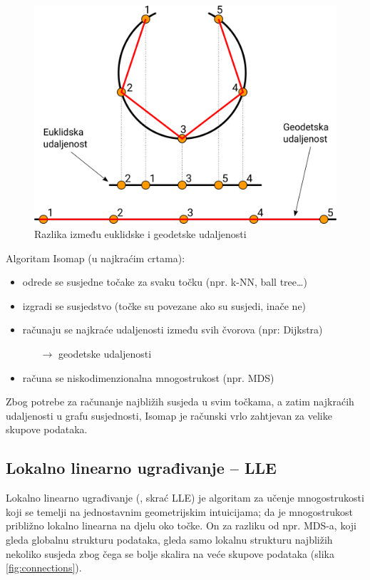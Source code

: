 \documentclass[times, utf8, diplomski]{fer}
\begin{document}
\begin{figure}[htb]
    \centering
    \includegraphics[width=12cm]{resources/images/reduction/euclid_vs_geodetic.png}
    \caption{Razlika između euklidske i geodetske udaljenosti}
    \label{fig:euclid_vs_geodetic}
\end{figure}

Algoritam Isomap (u najkraćim crtama):
\begin{itemize}
    \item odrede se susjedne točake za svaku točku (npr. k-NN, ball tree\dots)
    \item izgradi se susjedstvo (točke su povezane ako su susjedi, inače ne)
    \item računaju se najkraće udaljenosti između svih čvorova (npr: Dijkstra)
          \begin{itemize}
              \item[$\rightarrow$] geodetske udaljenosti
          \end{itemize}
    \item računa se niskodimenzionalna mnogostrukost (npr. MDS)
\end{itemize}

\bigskip
Zbog potrebe za računanje najbližih susjeda u svim točkama, a zatim najkraćih udaljenosti u grafu susjednosti, Isomap je računski vrlo zahtjevan za velike skupove podataka.

\subsection{Lokalno linearno ugrađivanje -- LLE}
Lokalno linearno ugrađivanje (, skrać LLE) je algoritam za učenje mnogostrukosti koji se temelji na jednostavnim geometrijskim intuicijama; da je mnogostrukost približno lokalno linearna na djelu oko točke. On za razliku od npr. MDS-a, koji gleda globalnu strukturu podataka, gleda samo lokalnu strukturu najbližih nekoliko susjeda zbog čega se bolje skalira na veće skupove podataka (slika \ref{fig:connections}).
\end{document}
